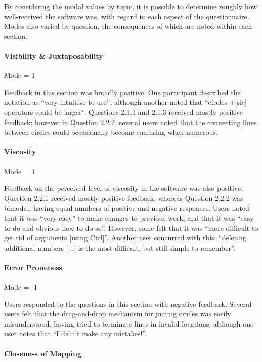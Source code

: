 \documentclass[12pt,twoside,notitlepage,xetex]{report}
\begin{document}
By considering the modal values by topic, it is possible to determine roughly how well-received the software was, with regard to each aspect of the questionnaire.  Modes also varied by question, the consequences of which are noted within each section.

\newpage
\paragraph{Visibility \& Juxtaposability}\hfill

Mode = 1

Feedback in this section was broadly positive.  One participant described the notation as ``very intuitive to use'', although another noted that ``circles +[sic] operators could be larger''.  Questions 2.1.1 and 2.1.3 received mostly positive feedback; however in Question 2.2.2, several users noted that the connecting lines between circles could occasionally become confusing when numerous.

\paragraph{Viscosity}\hfill

Mode = 1

Feedback on the perceived level of viscosity in the software was also positive. Question 2.2.1 received mostly positive feedback, whereas Question 2.2.2 was bimodal, having equal numbers of positive and negative responses.  Users noted that it was ``very easy'' to make changes to previous work, and that it was ``easy to do and obvious how to do so''.  However, some felt that it was ``more difficult to get rid of arguments [using Ctrl]''.  Another user concurred with this: ``deleting additional numbers [...] is the most difficult, but still simple to remember''.

\paragraph{Error Proneness}\hfill

Mode = -1

Users responded to the questions in this section with negative feedback.  Several users felt that the drag-and-drop mechanism for joining circles was easily misunderstood, having tried to terminate lines in invalid locations, although one user notes that ``I didn't make any mistakes!''.

\paragraph{Closeness of Mapping}\hfill
\end{document}
